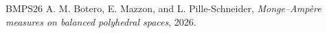 \documentclass{article}
\begin{document}




\begin{thebibliography}{BMPS26}
A. M. Botero, E. Mazzon, and L. Pille-Schneider,
\emph{Monge--Amp\`ere measures on balanced polyhedral spaces}, 2026.
\end{thebibliography}
\end{document}
